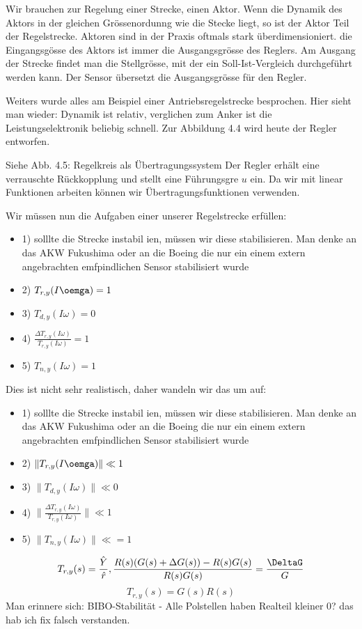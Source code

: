 \documentclass[a4paper]{article}
\begin{document}
Wir brauchen zur Regelung einer Strecke, einen Aktor. Wenn die Dynamik des Aktors in der gleichen Grössenordunng wie die Stecke liegt, so ist der Aktor Teil der Regelstrecke. Aktoren sind in der Praxis oftmals stark überdimensioniert. die Eingangsgösse des Aktors ist immer die Ausgangsgrösse des Reglers. Am Ausgang der Strecke findet man die Stellgrösse, mit der ein Soll-Ist-Vergleich durchgeführt werden kann. Der Sensor übersetzt die Ausgangsgrösse für den Regler.

Weiters wurde alles am Beispiel einer Antriebsregelstrecke besprochen. Hier sieht man wieder: Dynamik ist relativ, verglichen zum  Anker ist die Leistungselektronik beliebig schnell. Zur Abbildung 4.4 wird heute der Regler entworfen.

Siehe Abb. 4.5: Regelkreis als Übertragungssystem
Der Regler erhält eine verrauschte Rückkopplung und stellt eine Führungsgre $u$ ein. Da wir mit linear Funktionen arbeiten können wir Übertragungsfunktionen verwenden.

Wir müssen nun die Aufgaben einer unserer Regelstrecke erfüllen:
\begin{itemize}
    \item 1) solllte die Strecke instabil ien, müssen wir diese stabilisieren.
        Man denke an das AKW Fukushima oder an die Boeing die nur ein einem extern angebrachten emfpindlichen Sensor stabilisiert wurde
    \item 2) $T_{r,y}(I\oemga)=1$
    \item 3) $T_{d,y}(I\omega)=0$ 
    \item 4) $\frac{\Delta T_{r,y}(I\omega)}{T_{r,y}(I\omega)}=1$ 
    \item 5) $T_{n,y}(I\omega)=1$
\end{itemize}
Dies ist nicht sehr realistisch, daher wandeln wir das um auf:

\begin{itemize}
    \item 1) solllte die Strecke instabil ien, müssen wir diese stabilisieren.
        Man denke an das AKW Fukushima oder an die Boeing die nur ein einem extern angebrachten emfpindlichen Sensor stabilisiert wurde
    \item 2) $\|T_{r,y}(I\oemga)\|\ll1$
    \item 3) $\|T_{d,y}(I\omega)\|\ll0$ 
    \item 4) $\|\frac{\Delta T_{r,y}(I\omega)}{T_{r,y}(I\omega)}\|\ll1$ 
    \item 5) $\|T_{n,y}(I\omega)\|\ll=1$
\end{itemize}
\[ T_{r,y}(s)=\frac{\hat{Y}}{\hat{r}}, \frac{R(s)(G(s)+\Delta G(s))-R(s)G(s)}{R(s)G(s)}=\frac{\DeltaG}{G} \]
\[ T_{r,y}(s)=G(s)R(s) \]
Man erinnere sich: BIBO-Stabilität - Alle Polstellen haben Realteil kleiner 0? das hab ich fix falsch verstanden.
\end{document}
